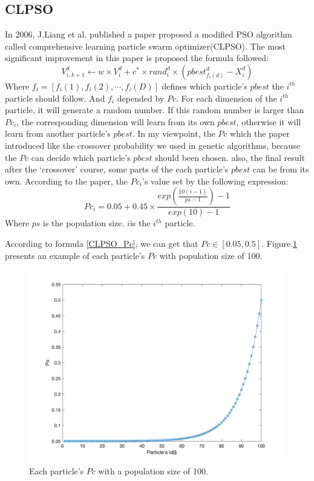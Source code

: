 \documentclass[letterpaper,12pt]{article}
\begin{document}
\subsection{CLPSO}
\par In 2006, J.Liang et al. published a paper\cite{J.Liang} proposed a modified PSO algorithm called comprehensive learning particle swarm optimizer(CLPSO). The most significant improvement in this paper is proposed the formula followed:
\begin{equation}
V_{i,k+1}^d \leftarrow w \times V_{i}^d + c^*\times rand_{i}^d \times (pbest_{f_i(d)}^d - X_{i}^d)
\label{CLPSO_velocity}
\end{equation}
Where $f_i = [f_i(1), f_i(2),\cdots, f_i(D)]$ defines which particle's $pbest$ the $i^{th}$ particle should follow. And $f_i$ depended by $Pc$. For each dimension of the $i^{th}$ particle, it will generate a random number. If this random number is larger than $Pc_i$, the corresponding dimension will learn from its own $pbest$, otherwise it will learn from another particle’s $pbest$. In my viewpoint, the $Pc$ which the paper introduced like the crossover probability we used in genetic algorithms, because the $Pc$ can decide which particle's $pbest$ should been chosen. also, the final result after the `crossover' course, some parts of the each particle's $pbest$ can be from its own. According to the paper, the $Pc_i$'s value set by the following expression:
\begin{equation}
Pc_i = 0.05 + 0.45\times \frac{exp(\frac{10(i-1)}{ps-1}) - 1}{exp(10) - 1}
\label{CLPSO_Pc}
\end{equation}
Where $ps$ is the population size. $i$is the $i^{th}$ particle.
\par According to formula \ref{CLPSO_Pc}, we can get that $Pc \in [0.05, 0.5]$. Figure.\ref{fig:CLPSO_Pc} presents an example of each particle's $Pc$ with population size of 100.

\begin{figure}[h]
\centering
\includegraphics[scale=0.4]{./figure/Pc}
\caption{Each particle’s $Pc$ with a population size of 100.}
\label{fig:CLPSO_Pc}
\end{figure}
\end{document}

